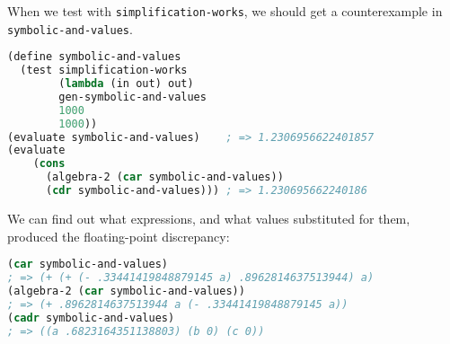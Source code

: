 When we test with \verb|simplification-works|, we should get a counterexample in \verb|symbolic-and-values|.

\begin{lstlisting}[language=lisp]
(define symbolic-and-values
  (test simplification-works
        (lambda (in out) out)
        gen-symbolic-and-values
        1000
        1000))
(evaluate symbolic-and-values)    ; => 1.2306956622401857
(evaluate
    (cons
      (algebra-2 (car symbolic-and-values))
      (cdr symbolic-and-values))) ; => 1.230695662240186
\end{lstlisting}

We can find out what expressions, and what values substituted for them, produced the floating-point discrepancy:

\begin{lstlisting}[language=lisp]
(car symbolic-and-values)
; => (+ (+ (- .33441419848879145 a) .8962814637513944) a)
(algebra-2 (car symbolic-and-values))
; => (+ .8962814637513944 a (- .33441419848879145 a))
(cadr symbolic-and-values)
; => ((a .6823164351138803) (b 0) (c 0))
\end{lstlisting}